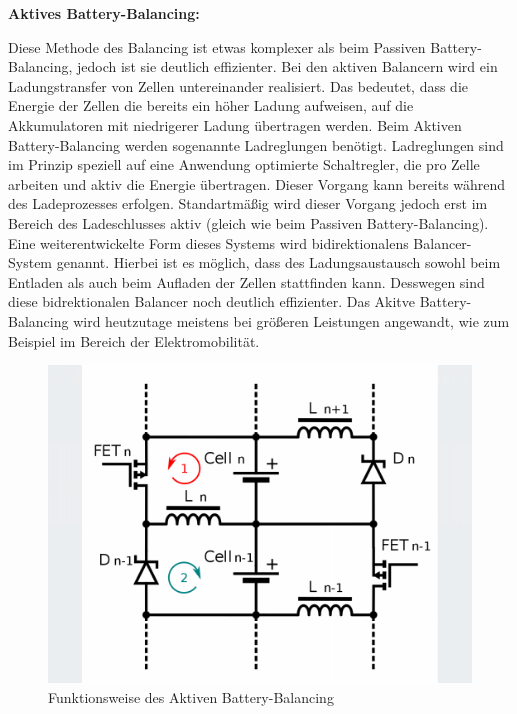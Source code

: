 \textbf{Aktives Battery-Balancing:}

Diese Methode des Balancing ist etwas komplexer als beim Passiven Battery-Balancing, jedoch ist sie deutlich effizienter. Bei den aktiven Balancern wird ein Ladungstransfer von Zellen untereinander realisiert. Das bedeutet, dass die Energie der Zellen die bereits ein höher Ladung aufweisen, auf die Akkumulatoren mit niedrigerer Ladung übertragen werden. Beim Aktiven Battery-Balancing werden sogenannte Ladreglungen benötigt. Ladreglungen sind im Prinzip speziell auf eine Anwendung optimierte Schaltregler, die pro Zelle arbeiten und aktiv die Energie übertragen. Dieser Vorgang kann bereits während des Ladeprozesses erfolgen. Standartmäßig wird dieser Vorgang jedoch erst im Bereich des Ladeschlusses aktiv (gleich wie beim Passiven Battery-Balancing). Eine weiterentwickelte Form dieses Systems wird bidirektionalens Balancer-System genannt. Hierbei ist es möglich, dass des Ladungsaustausch sowohl beim Entladen als auch beim Aufladen der Zellen stattfinden kann. Desswegen sind diese bidrektionalen Balancer noch deutlich effizienter. Das Akitve Battery-Balancing wird heutzutage meistens bei größeren Leistungen angewandt, wie zum Beispiel im Bereich der Elektromobilität.

\begin{figure}[H]
	\begin{center}
		\includegraphics[scale=0.4]{figures/Akku/Aktives Balancing.png}
		\caption{Funktionsweise des Aktiven Battery-Balancing}
	\end{center}
\end{figure}

